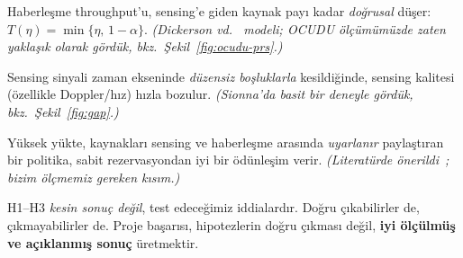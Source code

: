 \begin{description}[leftmargin=2.2em,labelwidth=2em,font=\sffamily\bfseries\color{acc}]
\item[H1] Haberleşme throughput'u, sensing'e giden kaynak payı kadar \emph{doğrusal} düşer: $T(\eta)=\min\{\eta,\,1-\alpha\}$.
  \textit{(Dickerson vd.~\cite{dickerson} modeli; OCUDU ölçümümüzde zaten yaklaşık olarak gördük, bkz.~Şekil~\ref{fig:ocudu-prs}.)}
\item[H2] Sensing sinyali zaman ekseninde \emph{düzensiz boşluklarla} kesildiğinde, sensing kalitesi (özellikle Doppler/hız) hızla bozulur.
  \textit{(Sionna'da basit bir deneyle gördük, bkz.~Şekil~\ref{fig:gap}.)}
\item[H3] Yüksek yükte, kaynakları sensing ve haberleşme arasında \emph{uyarlanır} paylaştıran bir politika, sabit rezervasyondan iyi bir ödünleşim verir.
  \textit{(Literatürde önerildi~\cite{dickerson}; bizim ölçmemiz gereken kısım.)}
\end{description}

\begin{dikkat}
H1--H3 \emph{kesin sonuç değil}, test edeceğimiz iddialardır. Doğru çıkabilirler de, çıkmayabilirler de. Proje başarısı, hipotezlerin doğru çıkması değil,
\textbf{iyi ölçülmüş ve açıklanmış sonuç} üretmektir.
\end{dikkat}
